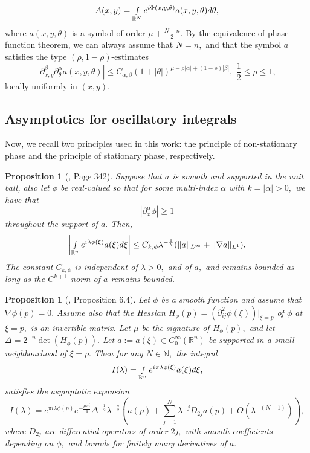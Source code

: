 \documentclass[12pt, reqno]{amsart}
\newtheorem{proposition}[theorem]{Proposition}
\theoremstyle{definition}
\theoremstyle{remark}
\numberwithin{equation}{section}
\begin{document}
\begin{align*}
    A(x,y)=\smallint\limits_{\mathbb{R}^N}e^{i\Phi(x,y,\theta)}a(x,y,\theta)d\theta,
\end{align*}where $a(x,y,\theta)$ is a symbol of order $\mu+\frac{N-n}{2}.$ 
By the equivalence-of-phase-function theorem, we can always assume that $N=n,$ and that the symbol $a$ satisfies the type $(\rho,1-\rho)$-estimates
\begin{equation}
    |\partial_{x,y}^{\beta}\partial_\theta^\alpha a(x,y,\theta)|\leq C_{\alpha,\beta}(1+|\theta|)^{\mu-\rho|\alpha|+(1-\rho)|\beta|},\,\,\frac{1}{2}\leq \rho\leq 1,
\end{equation}locally uniformly in $(x,y).$  

\subsection{Asymptotics for oscillatory integrals}
Now, we recall two principles used in this work: the principle of non-stationary phase and the principle of stationary phase, respectively.


\begin{proposition}[\cite{SteinBook1993}, Page 342]\label{Non-stationary:phase}
    Suppose that $a $ is smooth and supported in the unit ball, also let $\phi$ be real-valued so that for some multi-index $\alpha$ with $k=|\alpha|>0,$ we have that 
    $$|\partial_x^\alpha \phi|\geq 1 $$
    throughout  the support of $a.$ Then,
    $$\left|\smallint_{\mathbb{R}^n}e^{i\lambda \phi(\xi)}a(\xi)d\xi\right|\leq C_{k,\phi}\lambda^{-\frac{1}{k}}(\Vert a\Vert_{L^\infty}+\Vert\nabla a\Vert_{L^1}).  $$ The constant $C_{k,\phi}$ is independent of $\lambda>0,$ and of $a,$ and remains bounded as long as the $C^{k+1}$
norm of $a$ remains bounded.
\end{proposition}

\begin{proposition}[\cite{Wolf2003}, Proposition 6.4]\label{Stationar:phase} Let $\phi$ be a smooth function and assume that $\nabla \phi(p)=0.$ Assume also that the Hessian $H_{\phi}(p)=(\partial_{ij}^2\phi(\xi))|_{\xi=p}$ of $\phi$ at $\xi=p,$   is an invertible matrix. Let $\mu$ be the signature of $H_{\phi}(p),$ and let $\Delta=2^{-n}\det(H_{\phi}(p)). $ Let $a:=a(\xi)\in C^\infty_0(\mathbb{R}^n)$ be supported in a small neighbourhood of $\xi=p.$ Then for any $N\in \mathbb{N},$ the integral
$$I(\lambda)=\smallint_{\mathbb{R}^n} e^{i\pi \lambda\phi(\xi)}a(\xi)d\xi,$$ satisfies the asymptotic expansion
    \begin{equation}
        I(\lambda)=e^{\pi i\lambda \phi(p)}e^{-\frac{\mu \pi i }{4}}\Delta^{-\frac{1}{2}}\lambda^{-\frac{n}{2}}\left(a(p)+\sum_{j=1}^N\lambda^{-j}D_{2j}a(p)+O(\lambda^{-(N+1)})\right),
    \end{equation}where $D_{2j}$ are differential operators of order $2j,$ with smooth coefficients depending on $\phi,$ and bounds for finitely many derivatives of $a.$
\end{proposition}
\end{document}
